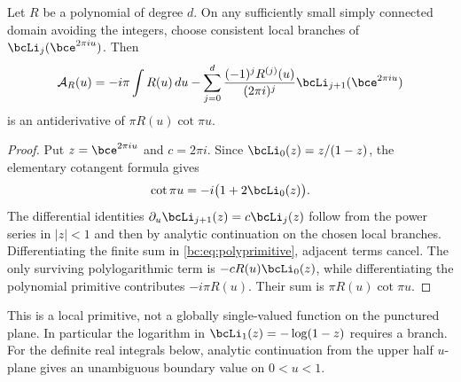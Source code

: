 \begin{proposition}
\label{bc:prop:polyprimitive}
Let $R$ be a polynomial of degree $d$. On any sufficiently small simply
connected domain avoiding the integers, choose consistent local
branches of $\bcLi_j(\bce^{2\pi i u})$. Then
\begin{equation}\label{bc:eq:polyprimitive}
 \mathcal A_R(u)=
 -i\pi\int R(u)\,du
 -\sum_{j=0}^{d}\frac{(-1)^jR^{(j)}(u)}{(2\pi i)^j}
                       \bcLi_{j+1}(\bce^{2\pi i u})
\end{equation}
is an antiderivative of $\pi R(u)\cot\pi u$.
\end{proposition}
\begin{proof}
Put $z=\bce^{2\pi i u}$ and $c=2\pi i$. Since
$\bcLi_0(z)=z/(1-z)$, the elementary cotangent formula gives
\[
 \cot\pi u=-i\bigl(1+2\bcLi_0(z)\bigr).
\]
The differential identities
$\partial_u\bcLi_{j+1}(z)=c\bcLi_j(z)$ follow from the power series
in $|z|<1$ and then by analytic continuation on the chosen local
branches. Differentiating the finite sum in
\eqref{bc:eq:polyprimitive}, adjacent terms cancel. The only surviving
polylogarithmic term is $-cR(u)\bcLi_0(z)$, while differentiating the
polynomial primitive contributes $-i\pi R(u)$. Their sum is
$\pi R(u)\cot\pi u$.
\end{proof}

This is a local primitive, not a globally single-valued function on the
punctured plane. In particular the logarithm in $\bcLi_1(z)=-\log(1-z)$
requires a branch. For the definite real integrals below, analytic
continuation from the upper half $u$-plane gives an unambiguous boundary
value on $0<u<1$.

